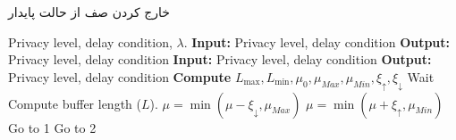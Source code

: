 \documentclass{report}
\begin{document}
	
\begin{algorithm}
	\caption{
		خارج کردن صف از حالت پایدار
	}
	\label{alg1}
	\begin{latin}
		\begin{algorithmic}[1]
			\REQUIRE Privacy level, delay condition, $\lambda$. 
			 \STATEx\textbf{Input:}  Privacy level, delay condition
			\STATEx  \textbf{Output:}  Privacy level, delay condition
			\STATE\textbf{Input:}  Privacy level, delay condition
			\STATE  \textbf{Output:}  Privacy level, delay condition
			\STATE \textbf{Compute} $L_{\max}  , L_{\min} , \mu_{0} , \mu_{Max}, \mu_{Min}, \xi_{\uparrow}, \xi_{\downarrow}$
			\STATE Wait
			\ENDWHILE
			\STATE Compute buffer length ($L$).
			\STATE $\mu = \min (\mu - \xi_{\downarrow},\mu_{Max})$
			\STATE $\mu = \min (\mu + \xi_{\uparrow},\mu_{Min})$
			\ENDIF
			\STATE Go to 1
			\ELSE
			\STATE Go to 2
			\ENDIF
		\end{algorithmic}
	\end{latin}
\end{algorithm}
\end{document}
